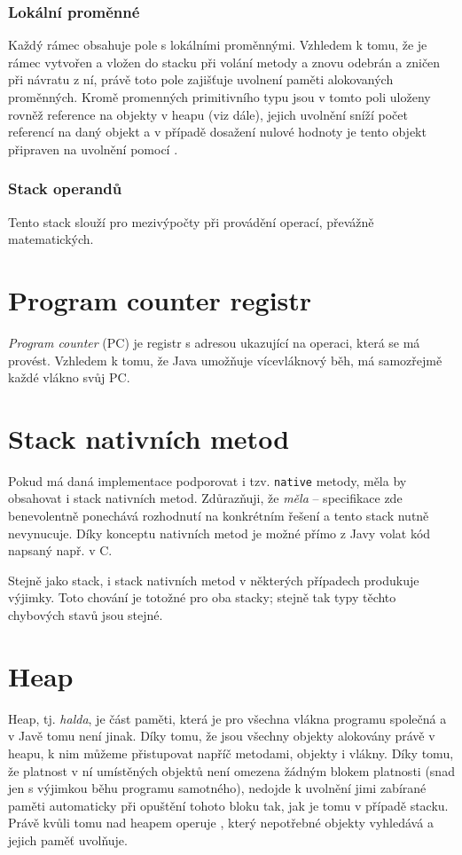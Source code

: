 \subsubsection{Lokální proměnné}
Každý rámec obsahuje pole s lokálními proměnnými. Vzhledem k tomu, že je rámec vytvořen a vložen do  stacku při volání metody a znovu odebrán a zničen při návratu z ní, právě toto pole zajišťuje uvolnení paměti alokovaných proměnných. Kromě promenných primitivního typu jsou v tomto poli uloženy rovněž reference na objekty v heapu (viz dále), jejich uvolnění sníží počet referencí na daný objekt a v případě dosažení nulové hodnoty je tento objekt připraven na uvolnění pomocí .

\subsubsection{Stack operandů}
Tento stack slouží pro mezivýpočty při provádění operací, převážně matematických.

\section{Program counter registr}
\textit{Program counter} (PC) je registr s adresou ukazující na operaci, která se má provést. Vzhledem k tomu, že Java umožňuje vícevláknový běh, má samozřejmě každé vlákno svůj PC. 

\section{Stack nativních metod}
Pokud má daná implementace  podporovat i tzv. \texttt{native} metody, měla by obsahovat i stack nativních metod. Zdůrazňuji, že \textit{měla} -- specifikace zde benevolentně ponechává rozhodnutí na konkrétním řešení a tento stack nutně nevynucuje. Díky konceptu nativních metod je možné přímo z Javy volat kód napsaný např. v C. 

Stejně jako  stack, i stack nativních metod v některých případech produkuje výjimky. Toto chování je totožné pro oba stacky; stejně tak typy těchto chybových stavů jsou stejné.

\section{Heap}
Heap, tj. \textit{halda}, je část paměti, která je pro všechna vlákna programu společná a v Javě tomu není jinak. Díky tomu, že jsou všechny objekty alokovány právě v heapu, k nim můžeme přistupovat napříč metodami, objekty i vlákny. Díky tomu, že platnost v ní umístěných objektů není omezena žádným blokem platnosti (snad jen s výjimkou běhu programu samotného), nedojde k uvolnění jimi zabírané paměti automaticky při opuštění tohoto bloku tak, jak je tomu v případě stacku. Právě kvůli tomu nad heapem operuje , který nepotřebné objekty vyhledává a jejich paměť uvolňuje.

